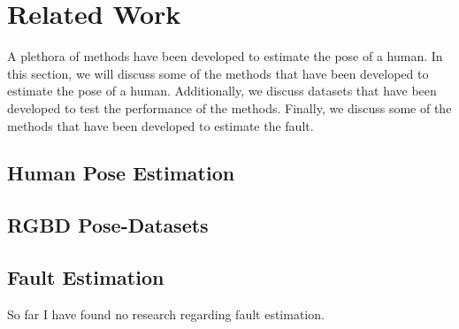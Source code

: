 \section{Related Work}
\label{sec:related_work}

A plethora of methods have been developed to estimate the pose of a human. In this section, we will discuss some of the methods that have been developed to estimate the pose of a human. Additionally, we discuss datasets that have been developed to test the performance of the methods. Finally, we discuss some of the methods that have been developed to estimate the fault.


\subsection{Human Pose Estimation}

\subsection{RGBD Pose-Datasets}

\subsection{Fault Estimation}

So far I have found no research regarding fault estimation.
